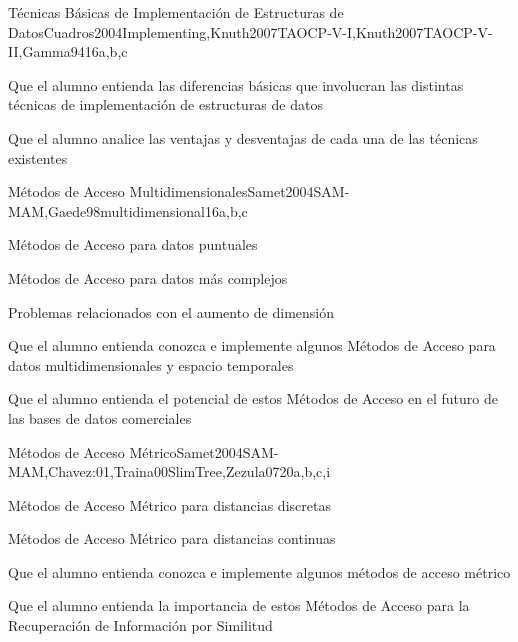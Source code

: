 \begin{syllabus}
\begin{unit}{Técnicas Básicas de Implementación de Estructuras de Datos}{Cuadros2004Implementing,Knuth2007TAOCP-V-I,Knuth2007TAOCP-V-II,Gamma94}{16}{a,b,c}
   \begin{learningoutcomes}
         \item Que el alumno entienda las diferencias básicas que involucran las distintas técnicas de implementación de estructuras de datos
         \item Que el alumno analice las ventajas y desventajas de cada una de las técnicas existentes
   \end{learningoutcomes}
\end{unit}

\begin{unit}{Métodos de Acceso Multidimensionales}{Samet2004SAM-MAM,Gaede98multidimensional}{16}{a,b,c}
   \begin{topics}
         \item Métodos de Acceso para datos puntuales
         \item Métodos de Acceso para datos más complejos
         \item Problemas relacionados con el aumento de dimensión
   \end{topics}

   \begin{learningoutcomes}
         \item Que el alumno entienda conozca e implemente algunos Métodos de Acceso para datos multidimensionales y espacio temporales
         \item Que el alumno entienda el potencial de estos Métodos de Acceso en el futuro de las bases de datos comerciales
   \end{learningoutcomes}
\end{unit}

\begin{unit}{Métodos de Acceso Métrico}{Samet2004SAM-MAM,Chavez:01,Traina00SlimTree,Zezula07}{20}{a,b,c,i}
   \begin{topics}
         \item Métodos de Acceso Métrico para distancias discretas
         \item Métodos de Acceso Métrico para distancias continuas
   \end{topics}

   \begin{learningoutcomes}
         \item Que el alumno entienda conozca e implemente algunos métodos de acceso métrico
         \item Que el alumno entienda la importancia de estos Métodos de Acceso para la Recuperación de Información por Similitud
   \end{learningoutcomes}
\end{unit}


\end{syllabus}
